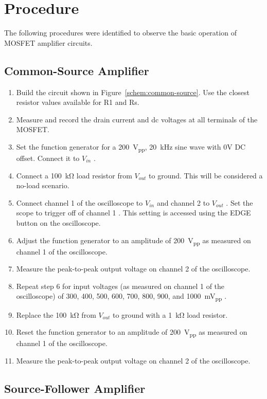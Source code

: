 \section{Procedure}
\label{sec:procedure}

The following procedures were identified to observe the basic operation of MOSFET amplifier circuits.

\subsection{Common-Source Amplifier}

\begin{enumerate}
\item Build the circuit shown in Figure~\ref{schem:common-source}.  Use the closest resistor values available for R1 and Rs.
\item Measure and record the drain current and dc voltages at all terminals of the MOSFET.
\item Set the function generator for a \SI{200}{V_{pp}}, \SI{20}{kHz} sine wave with 0V DC offset.  Connect it to $V_{in}$ .
\item Connect a \SI{100}{\kilo\ohm} load resistor from $V_{out}$ to ground. This will be considered a no-load scenario.
\item Connect channel 1 of the oscilloscope to $V_{in}$ and channel 2 to $V_{out}$ . Set the scope to trigger off of channel 1 . This setting is accessed using the EDGE button on the oscilloscope.
\item Adjust the function generator to an amplitude of \SI{200}{V_{pp}} as measured on channel 1 of the oscilloscope.
\item Measure the peak-to-peak output voltage on channel 2 of the oscilloscope.
\item Repeat step 6 for input voltages (as measured on channel 1 of the oscilloscope) of 300, 400, 500, 600, 700, 800, 900, and \SI{1000}{mV_{pp}} .
\item Replace the \SI{100}{\kilo\ohm} from $V_{out}$ to ground with a \SI{1}{\kilo\ohm} load resistor.
\item Reset the function generator to an amplitude of \SI{200}{V_{pp}} as measured on channel 1 of the oscilloscope.
\item Measure the peak-to-peak output voltage on channel 2 of the oscilloscope.
\end{enumerate}

\subsection{Source-Follower Amplifier}

